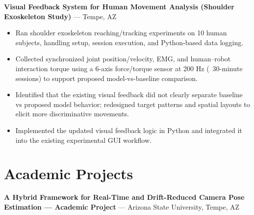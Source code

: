 \documentclass[11pt]{article}
\begin{document}
\textbf{ Visual Feedback System for Human Movement Analysis (Shoulder Exoskeleton Study) } --- Tempe, AZ\\

\begin{itemize}[leftmargin=*,noitemsep]
  
  \item Ran shoulder exoskeleton reaching/tracking experiments on 10 human subjects, handling setup, session execution, and Python-based data logging.
  
  \item Collected synchronized joint position/velocity, EMG, and human–robot interaction torque using a 6-axis force/torque sensor at 200 Hz (~30-minute sessions) to support proposed model-vs-baseline comparison.
  
  \item Identified that the existing visual feedback did not clearly separate baseline vs proposed model behavior; redesigned target patterns and spatial layouts to elicit more discriminative movements.
  
  \item Implemented the updated visual feedback logic in Python and integrated it into the existing experimental GUI workflow.
  
\end{itemize}


\vspace{2pt}


\section*{ Academic Projects }

\textbf{ A Hybrid Framework for Real-Time and Drift-Reduced Camera Pose Estimation — Academic Project } --- Arizona State University, Tempe, AZ\\
\end{document}
